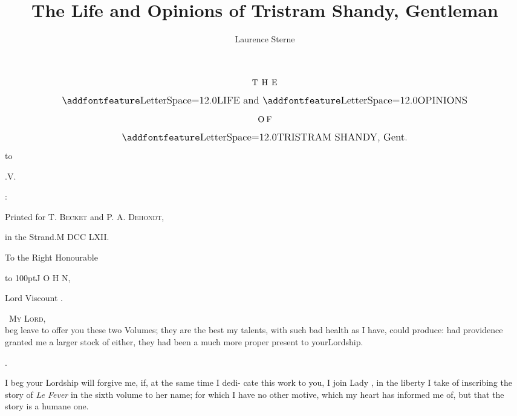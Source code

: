 \documentclass[twoside]{article}
\title{The Life and Opinions of Tristram Shandy, Gentleman}
\author{Laurence Sterne}
\begin{document}
\pagestyle{empty}
\null
\vfill
$$\vbox{\openup 10pt\halign{\hss #\hss\cr
\hbox to 3em{T H E}\cr
\large \ls{LIFE} and \ls{OPINIONS}\cr
\hbox to 1.6em{O F}\cr
\large \ls{TRISTRAM SHANDY}, Gent.\cr
}}$$
\vfill
\newpage
\null
\newpage %
\vbox{\openup 10pt}
\vfill
\vbox{\openup -2pt\halign to }
\vfill
\centerline{.\quad V.}
\vfill
\centerline{:}
\centerline{\small Printed for T. \textsc{Becket} and P. A. \textsc{Dehondt},}
\centerline{\small in the Strand.\quad M DCC LXII.}

\newpage
\null
\newpage
\bgroup\fontsize{11}{16}\selectfont
\setlength{\baselineskip}{16pt}  %
\centerline{\small To the Right Honourable}
\vfill
\centerline{\huge \hbox to 100pt{J O H N},}
\vfill
\centerline{\large Lord Viscount .}
\vfill
\noindent\ \textsc{My Lord},\\[-24pt]
 beg leave to offer you\break
these two Volumes; they are\break
the best my talents, with such bad\break
health as I have, could produce:\tsk\break
had providence granted me a larger\break
stock of either, they had been a\break
much more proper present to your\break Lordship.


\newpage
\centerline{.}

I beg your Lordship will forgive\break
me, if, at the same time I dedi-\break
cate this work to you, I join Lady\break
{}, in the liberty I take of\break
inscribing the story of \textit{Le Fever} in\break
the sixth volume to her name; for\break
which I have no other motive, which\break
my heart has informed me of, but\break
that the story is a humane one.

\parskip
\end{document}
